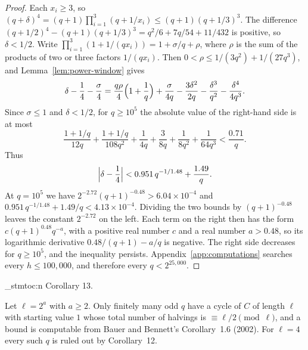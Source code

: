 \documentclass[11pt]{article}
\newenvironment{named}[1]{%
  \par\addvspace{\medskipamount}%
  \pagebreak[3]%
  \noindent{\bfseries #1}\space\ignorespaces
  \stmtoc{#1}%
}{\par\addvspace{\medskipamount}}
\newcommand{\stmtoc}[1]{ \qn_stmtoc:n {#1} }
\begin{document}
\begin{proof}
Each $x_i \ge 3$, so $(q+\delta)^4 = (q+1)\prod_{i=1}^{3}(q + 1/x_i) \le (q+1)(q+1/3)^3$.
The difference $(q+1/2)^4 - (q+1)(q+1/3)^3 = q^2/6 + 7q/54 + 11/432$ is positive, so $\delta < 1/2$.
Write $\prod_{i=1}^{3}(1 + 1/(q x_i)) = 1 + \sigma/q + \rho$, where $\rho$ is the sum of the products of two or three factors $1/(q x_i)$.
Then $0 < \rho \le 1/(3q^2) + 1/(27q^3)$, and Lemma~\ref{lem:power-window} gives
\[
\delta - \frac14 - \frac{\sigma}{4} = \frac{q\rho}{4}\Bigl(1+\frac1q\Bigr) + \frac{\sigma}{4q} - \frac{3\delta^2}{2q} - \frac{\delta^3}{q^2} - \frac{\delta^4}{4q^3}.
\]
Since $\sigma \le 1$ and $\delta < 1/2$, for $q \ge 10^5$ the absolute value of the right-hand side is at most
\[
\frac{1+1/q}{12q} + \frac{1+1/q}{108q^2} + \frac{1}{4q} + \frac{3}{8q} + \frac{1}{8q^2} + \frac{1}{64q^3} < \frac{0.71}{q}.
\]
Thus
\[
\Bigl|\delta - \frac14\Bigr| < 0.951\, q^{-1/1.48} + \frac{1.49}{q}.
\]
At $q = 10^5$ we have $2^{-2.72}(q+1)^{-0.48} > 6.04 \times 10^{-4}$ and $0.951\, q^{-1/1.48} + 1.49/q < 4.13 \times 10^{-4}$.
Dividing the two bounds by $(q+1)^{-0.48}$ leaves the constant $2^{-2.72}$ on the left.
Each term on the right then has the form $c(q+1)^{0.48} q^{-a}$, with a positive real number $c$ and a real number $a > 0.48$, so its logarithmic derivative $0.48/(q+1) - a/q$ is negative.
The right side decreases for $q \ge 10^5$, and the inequality persists.
Appendix~\ref{app:computations} searches every $h \le 100{,}000$, and therefore every $q < 2^{25{,}000}$.
\end{proof}

\begin{named}{Corollary 13.}
Let $\ell = 2^a$ with $a \ge 2$.
Only finitely many odd $q$ have a cycle of $C$ of length $\ell$ with starting value $1$ whose total number of halvings is $\equiv \ell/2 \pmod{\ell}$, and a bound is computable from Bauer and Bennett's Corollary~1.6 (2002).
For $\ell = 4$ every such $q$ is ruled out by Corollary~12.
\end{named}
\end{document}
